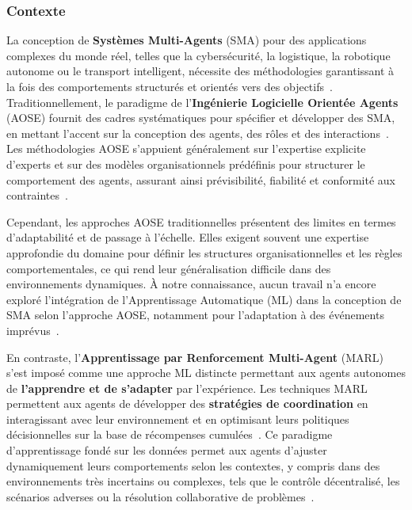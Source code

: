
\subsubsection{Contexte}


La conception de \textbf{Systèmes Multi-Agents} (SMA) pour des applications complexes du monde réel, telles que la cybersécurité, la logistique, la robotique autonome ou le transport intelligent, nécessite des méthodologies garantissant à la fois des comportements structurés et orientés vers des objectifs~\cite{Jamont2O15}. Traditionnellement, le paradigme de l'\textbf{Ingénierie Logicielle Orientée Agents} (AOSE) fournit des cadres systématiques pour spécifier et développer des SMA, en mettant l'accent sur la conception des agents, des rôles et des interactions~\cite{Pavon2003, Bernon2005}. Les méthodologies AOSE s'appuient généralement sur l'expertise explicite d'experts et sur des modèles organisationnels prédéfinis pour structurer le comportement des agents, assurant ainsi prévisibilité, fiabilité et conformité aux contraintes~\cite{Hindriks2014}.

Cependant, les approches AOSE traditionnelles présentent des limites en termes d'adaptabilité et de passage à l'échelle. Elles exigent souvent une expertise approfondie du domaine pour définir les structures organisationnelles et les règles comportementales, ce qui rend leur généralisation difficile dans des environnements dynamiques. À notre connaissance, aucun travail n'a encore exploré l'intégration de l'Apprentissage Automatique (ML) dans la conception de SMA selon l'approche AOSE, notamment pour l'adaptation à des événements imprévus~\cite{Garcia2004}.

En contraste, l'\textbf{Apprentissage par Renforcement Multi-Agent} (MARL) s'est imposé comme une approche ML distincte permettant aux agents autonomes de \textbf{l'apprendre et de s'adapter} par l'expérience. Les techniques MARL permettent aux agents de développer des \textbf{stratégies de coordination} en interagissant avec leur environnement et en optimisant leurs politiques décisionnelles sur la base de récompenses cumulées~\cite{Zhang2021}. Ce paradigme d'apprentissage fondé sur les données permet aux agents d'ajuster dynamiquement leurs comportements selon les contextes, y compris dans des environnements très incertains ou complexes, tels que le contrôle décentralisé, les scénarios adverses ou la résolution collaborative de problèmes~\cite{Papoudakis2021}.

